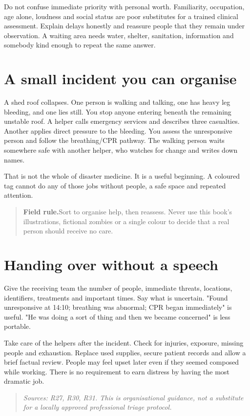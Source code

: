 \documentclass[10pt,openright]{book}
\newcommand{\fieldrule}[1]{\begin{quote}\textbf{Field rule.}\enspace #1\end{quote}}
\begin{document}
Do not confuse immediate priority with personal worth. Familiarity, occupation, age alone, loudness and social status are poor substitutes for a trained clinical assessment. Explain delays honestly and reassure people that they remain under observation. A waiting area needs water, shelter, sanitation, information and somebody kind enough to repeat the same answer.

\section*{A small incident you can organise}
A shed roof collapses. One person is walking and talking, one has heavy leg bleeding, and one lies still. You stop anyone entering beneath the remaining unstable roof. A helper calls emergency services and describes three casualties. Another applies direct pressure to the bleeding. You assess the unresponsive person and follow the breathing/CPR pathway. The walking person waits somewhere safe with another helper, who watches for change and writes down names.

That is not the whole of disaster medicine. It is a useful beginning. A coloured tag cannot do any of those jobs without people, a safe space and repeated attention.

\fieldrule{Sort to organise help, then reassess. Never use this book's illustrations, fictional zombies or a single colour to decide that a real person should receive no care.}
\section*{Handing over without a speech}
Give the receiving team the number of people, immediate threats, locations, identifiers, treatments and important times. Say what is uncertain. "Found unresponsive at 14:10; breathing was abnormal; CPR began immediately" is useful. "He was doing a sort of thing and then we became concerned" is less portable.

Take care of the helpers after the incident. Check for injuries, exposure, missing people and exhaustion. Replace used supplies, secure patient records and allow a brief factual review. People may feel upset later even if they seemed composed while working. There is no requirement to earn distress by having the most dramatic job.

\begin{quote}\emph{Sources: R27, R30, R31. This is organisational guidance, not a substitute for a locally approved professional triage protocol.}\end{quote}
\end{document}
